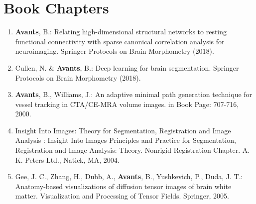 \documentclass[11pt]{moderncv} %
\begin{document}
\section{Book Chapters}
\begin{enumerate}
\item \textbf{Avants}, B.: Relating high-dimensional structural networks to
resting functional connectivity with sparse canonical correlation analysis
for neuroimaging.  Springer Protocols on Brain Morphometry (2018).
\item Cullen, N. \& \textbf{Avants}, B.: Deep learning for brain segmentation.  Springer Protocols on Brain Morphometry (2018).
\item \textbf{Avants}, B., Williams, J.: An adaptive minimal path generation technique for vessel tracking in CTA/CE-MRA volume images. in Book Page: 707-716, 2000.
\item Insight Into Images: Theory for Segmentation, Registration and Image Analysis :
Insight Into Images Principles and Practice for Segmentation, Registration and Image Analysis: Theory. Nonrigid Registration Chapter. A. K. Peters Ltd., Natick, MA, 2004.
\item Gee, J. C., Zhang, H., Dubb, A., \textbf{Avants}, B., Yushkevich, P., Duda, J. T.: Anatomy-based visualizations of diffusion tensor images of brain white matter. Visualization and Processing of Tensor Fields. Springer, 2005.
\end{enumerate}


% 
% 
\end{document}
